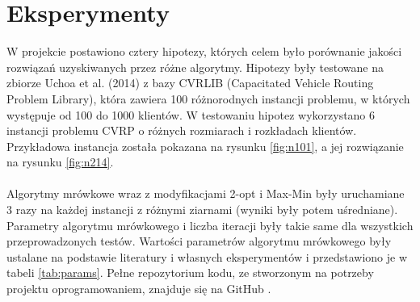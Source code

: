 \documentclass{article}
\begin{document}
\section{Eksperymenty}
W projekcie postawiono cztery hipotezy, których celem było porównanie jakości rozwiązań uzyskiwanych przez różne algorytmy. Hipotezy były testowane na zbiorze Uchoa et al. (2014) \cite{Uchoa} z bazy CVRLIB (Capacitated Vehicle Routing Problem Library), która zawiera 100 różnorodnych instancji problemu, w których występuje od 100 do 1000 klientów. W testowaniu hipotez wykorzystano 6 instancji problemu CVRP o różnych rozmiarach i rozkładach klientów. Przykładowa instancja została pokazana na rysunku \ref{fig:n101}, a jej rozwiązanie na rysunku \ref{fig:n214}. 
\\ \\
Algorytmy mrówkowe wraz z modyfikacjami 2-opt i Max-Min były uruchamiane 3 razy na każdej instancji z różnymi ziarnami (wyniki były potem uśredniane). Parametry algorytmu mrówkowego i liczba iteracji były takie same dla wszystkich przeprowadzonych testów. Wartości parametrów algorytmu mrówkowego były ustalane na podstawie literatury i własnych eksperymentów i przedstawiono je w tabeli \ref{tab:params}. Pełne repozytorium kodu, ze stworzonym na potrzeby projektu oprogramowaniem, znajduje się na GitHub \cite{msi2ants}.
\end{document}
